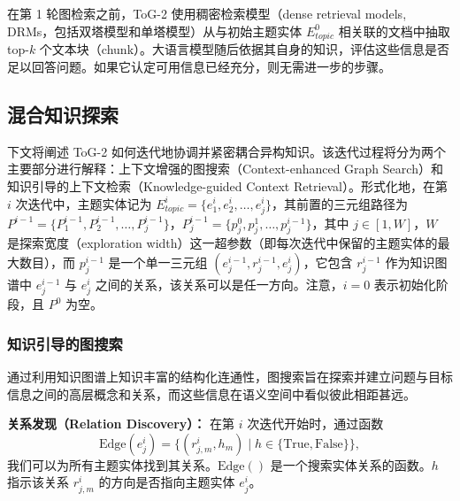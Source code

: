 \documentclass[11pt,UTF8,fontset=fandol]{ctexart}
\newcommand{\toctwo}{ToG-2}
\begin{document}
在第 1 轮图检索之前，\toctwo{} 使用稠密检索模型（dense retrieval models, DRMs，包括双塔模型和单塔模型）从与初始主题实体 $E^{0}_{topic}$ 相关联的文档中抽取 top-$k$ 个文本块（chunk）。大语言模型随后依据其自身的知识，评估这些信息是否足以回答问题。如果它认定可用信息已经充分，则无需进一步的步骤。

\subsection{混合知识探索}

下文将阐述 \toctwo{} 如何迭代地协调并紧密耦合异构知识。该迭代过程将分为两个主要部分进行解释：上下文增强的图搜索（Context-enhanced Graph Search）和知识引导的上下文检索（Knowledge-guided Context Retrieval）。形式化地，在第 $i$ 次迭代中，主题实体记为 $E^{i}_{topic}=\{e^{i}_{1},e^{i}_{2},\ldots,e^{i}_{j}\}$，其前置的三元组路径为 $P^{i-1}=\{P^{i-1}_{1},P^{i-1}_{2},\ldots,P^{i-1}_{j}\}$，$P^{i-1}_{j}=\{p^{0}_{j},p^{1}_{j},\ldots,p^{i-1}_{j}\}$，其中 $j\in[1,W]$，$W$ 是探索宽度（exploration width）这一超参数（即每次迭代中保留的主题实体的最大数目），而 $p^{i-1}_{j}$ 是一个单一三元组 $(e^{i-1}_{j},r^{i-1}_{j},e^{i}_{j})$，它包含 $r^{i-1}_{j}$ 作为知识图谱中 $e^{i-1}_{j}$ 与 $e^{i}_{j}$ 之间的关系，该关系可以是任一方向。注意，$i=0$ 表示初始化阶段，且 $P^{0}$ 为空。

\subsubsection{知识引导的图搜索}

通过利用知识图谱上知识丰富的结构化连通性，图搜索旨在探索并建立问题与目标信息之间的高层概念和关系，而这些信息在语义空间中看似彼此相距甚远。

\noindent\textbf{关系发现（Relation Discovery）：} 在第 $i$ 次迭代开始时，通过函数
\begin{equation}
\mathrm{Edge}(e^{i}_{j})=\{(r^{i}_{j,m},h_m)\mid h\in\{\mathrm{True},\mathrm{False}\}\},
\end{equation}
我们可以为所有主题实体找到其关系。$\mathrm{Edge}()$ 是一个搜索实体关系的函数。$h$ 指示该关系 $r^{i}_{j,m}$ 的方向是否指向主题实体 $e^{i}_{j}$。
\end{document}
